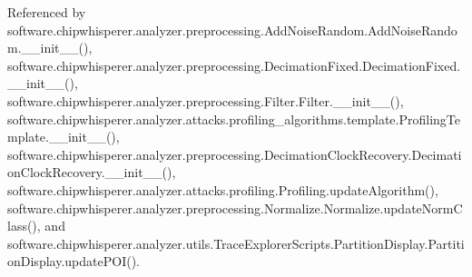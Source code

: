 Referenced by software.\+chipwhisperer.\+analyzer.\+preprocessing.\+Add\+Noise\+Random.\+Add\+Noise\+Random.\+\_\+\+\_\+init\+\_\+\+\_\+(), software.\+chipwhisperer.\+analyzer.\+preprocessing.\+Decimation\+Fixed.\+Decimation\+Fixed.\+\_\+\+\_\+init\+\_\+\+\_\+(), software.\+chipwhisperer.\+analyzer.\+preprocessing.\+Filter.\+Filter.\+\_\+\+\_\+init\+\_\+\+\_\+(), software.\+chipwhisperer.\+analyzer.\+attacks.\+profiling\+\_\+algorithms.\+template.\+Profiling\+Template.\+\_\+\+\_\+init\+\_\+\+\_\+(), software.\+chipwhisperer.\+analyzer.\+preprocessing.\+Decimation\+Clock\+Recovery.\+Decimation\+Clock\+Recovery.\+\_\+\+\_\+init\+\_\+\+\_\+(), software.\+chipwhisperer.\+analyzer.\+attacks.\+profiling.\+Profiling.\+update\+Algorithm(), software.\+chipwhisperer.\+analyzer.\+preprocessing.\+Normalize.\+Normalize.\+update\+Norm\+Class(), and software.\+chipwhisperer.\+analyzer.\+utils.\+Trace\+Explorer\+Scripts.\+Partition\+Display.\+Partition\+Display.\+update\+P\+O\+I().


